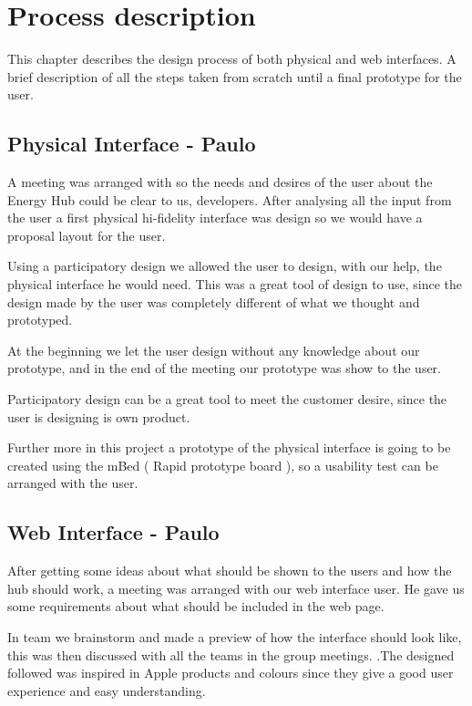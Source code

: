 \chapter{Process description}

This chapter describes the design process of both physical and web interfaces. A brief description of all the steps taken from scratch until a final prototype for the user.

\section{Physical Interface - Paulo}

A meeting was arranged with so the needs and desires of the user about the Energy Hub could be clear to us, developers. After analysing all the input from the user a first physical hi-fidelity interface was design so we would have a proposal layout for the user. 

Using a participatory design we allowed the user to design, with our help, the physical interface he would need. This was a great tool of design to use, since the design made by the user was completely different of what we thought and prototyped. 

At the beginning we let the user design without any knowledge about our prototype, and in the end of the meeting our prototype was show to the user.

Participatory design can be a great tool to meet the customer desire, since the user is designing is own product.

Further more in this project a prototype of the physical interface is going to be created using the mBed ( Rapid prototype board ), so a usability test can be arranged with the user.

\section{Web Interface - Paulo} 

After getting some ideas about what should be shown to the users and how the hub should work, a meeting was arranged with our web interface user. He gave us some requirements about what should be included in the web page.

In team we brainstorm and made a preview of how the interface should look like, this was then discussed with all the teams in the group meetings. .The designed followed was inspired in Apple products and colours since they give a good user experience and easy understanding.

